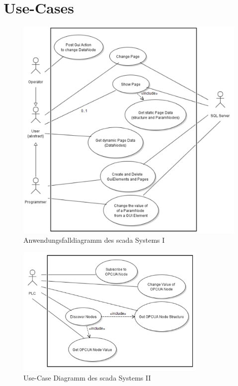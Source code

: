 \section{Use-Cases}
\begin{figure}[b]
  \centering
  \includegraphics[width=\textwidth]{content/hauptteil/systemEntwurf/res/useCase/I.pdf}
  \caption[Anwendungsfalldiagramm des \acs{scada} Systems I]{Anwendungsfalldiagramm des \acs{scada} Systems I}
  \label{fig:UCI}
\end{figure}
\begin{figure}[b]
  \centering
  \includegraphics[width=0.82\textwidth]{content/hauptteil/systemEntwurf/res/useCase/II.pdf}
  \caption[Use-Case Diagramm des \acs{scada} Systems II]{Use-Case Diagramm des \acs{scada} Systems II}
  \label{fig:UCII}
\end{figure}


